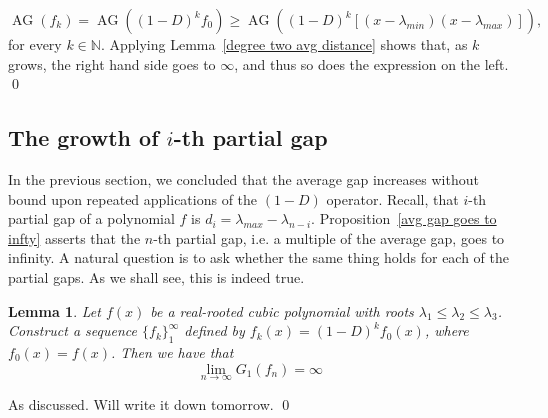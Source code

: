 \documentclass[11pt]{article}
\DeclareMathOperator{\AG}{AG}
\newtheorem{lemma}[theorem]{Lemma}
\begin{document}
\[\AG(f_k)= \AG((1-D)^kf_0)\geq\AG((1-D)^k [(x-\lambda_{min})(x-\lambda_{max})]),\]
for every $k\in\mathbb{N}$. Applying Lemma~\ref{degree two avg distance} shows that, as $k$ grows, the right hand side goes to $\infty$, and thus so does the expression on the left. \qed

\subsection{The growth of $i$-th partial gap}
In the previous section, we concluded that the average gap increases without bound upon repeated applications of the $(1-D)$ operator. Recall, that $i$-th partial gap of a polynomial $f$ is $d_i = \lambda_{max} - \lambda_{n-i}$. Proposition~\ref{avg gap goes to infty} asserts that the $n$-th partial gap, i.e. a multiple of the average gap, goes to infinity. A natural question is to ask whether the same thing holds for each of the partial gaps. As we shall see, this is indeed true.

\begin{lemma}
\label{all gaps grow - case with 3} 
Let $f(x)$ be a real-rooted cubic polynomial with roots $\lambda_1 \leq \lambda_2 \leq \lambda_3$. Construct a sequence $\{f_k\}_1^\infty$ defined by $f_k(x) = (1-D)^k f_0(x)$, where $f_0(x) = f(x)$. Then we have that 
\[\lim_{n\to \infty} G_1 (f_n) = \infty\]
\end{lemma}
\proof 
As discussed. Will write it down tomorrow. \qed
\end{document}
